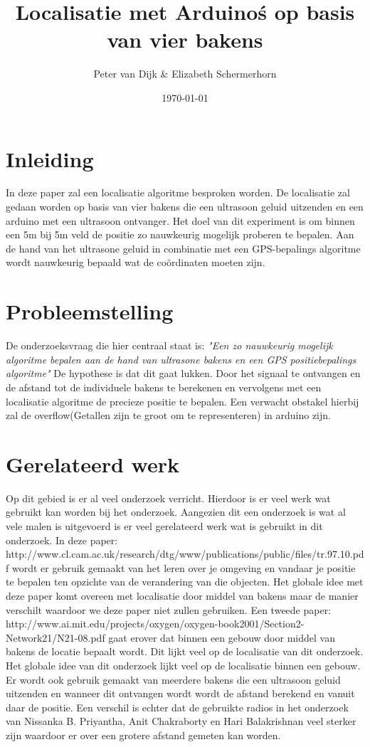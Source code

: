 \documentclass{article}
\author{Peter van Dijk \& Elizabeth Schermerhorn}
\date{\today}
\title{Localisatie met Arduino\'s op basis van vier bakens}
\begin{document}
\maketitle
\newpage
\tableofcontents
\clearpage
\section{Inleiding}
In deze paper zal een localisatie algoritme besproken worden. De localisatie zal gedaan worden op basis van vier bakens die een ultrasoon geluid uitzenden en een arduino met een ultrasoon ontvanger. Het doel van dit experiment is om binnen een 5m bij 5m veld de positie zo nauwkeurig mogelijk proberen te bepalen. Aan de hand van het ultrasone geluid in combinatie met een GPS-bepalings algoritme wordt nauwkeurig bepaald wat de co\"{o}rdinaten moeten zijn. 


\section{Probleemstelling}
De onderzoeksvraag die hier centraal staat is: \textit{"Een zo nauwkeurig mogelijk algoritme bepalen aan de hand van ultrasone bakens en een GPS positiebepalings algoritme"} 
De hypothese is dat dit  gaat lukken. Door het signaal te ontvangen en de afstand tot de individuele bakens te berekenen en vervolgens met een localisatie algoritme de precieze positie te bepalen. Een verwacht obstakel hierbij zal de overflow(Getallen zijn te groot om te representeren) in arduino zijn. 

\section{Gerelateerd werk}
Op dit gebied is er al veel onderzoek verricht. Hierdoor is er veel werk wat gebruikt kan worden bij het onderzoek. Aangezien dit een onderzoek is wat al vele malen is uitgevoerd is er veel gerelateerd werk wat is gebruikt in dit onderzoek. In deze paper: http://www.cl.cam.ac.uk/research/dtg/www/publications/public/files/tr.97.10.pdf wordt er gebruik gemaakt van het leren over je omgeving en vandaar je positie te bepalen ten opzichte van de verandering van die objecten. Het globale idee met deze paper komt overeen met localisatie door middel van bakens maar de manier verschilt waardoor we deze paper niet zullen gebruiken. Een tweede paper: http://www.ai.mit.edu/projects/oxygen/oxygen-book2001/Section2-Network21/N21-08.pdf gaat erover dat binnen een gebouw door middel van bakens de locatie bepaalt wordt. Dit lijkt veel op de localisatie van dit onderzoek. Het globale idee van dit onderzoek lijkt veel op de localisatie binnen een gebouw. Er wordt ook gebruik gemaakt van meerdere bakens die een ultrasoon geluid uitzenden en wanneer dit ontvangen wordt wordt de afstand berekend en vanuit daar de positie. Een verschil is echter dat de gebruikte radios in het onderzoek van Nissanka B. Priyantha, Anit Chakraborty en Hari Balakrishnan veel sterker zijn waardoor er over een grotere afstand gemeten kan worden. 
\end{document}
